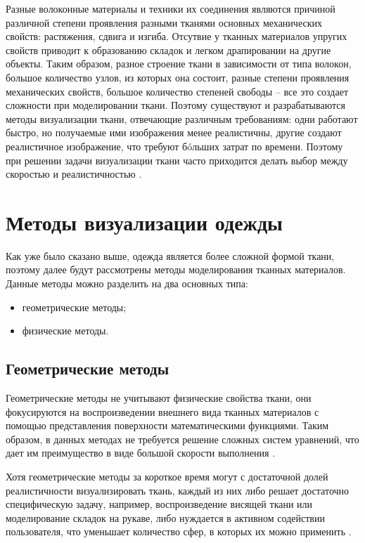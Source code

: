 Разные волоконные материалы и техники их соединения являются причиной
различной степени проявления разными тканями основных механических свойств:
растяжения, сдвига и изгиба. Отсутвие у тканных материалов упругих
свойств приводит к образованию складок и легком драпировании на другие
объекты. Таким образом, разное строение ткани в зависимости от типа волокон,
большое количество узлов, из которых она состоит, разные
степени проявления механических свойств, большое количество степеней свободы -- все это
создает сложности при моделировании ткани. Поэтому существуют и разрабатываются
методы визуализации ткани, отвечающие различным требованиям: одни работают
быстро, но получаемые ими изображения менее реалистичны, другие создают
реалистичное изображение, что требуют бóльших затрат по времени. Поэтому
при решении задачи визуализации ткани часто приходится делать выбор
между скоростью и реалистичностью \cite{bib11}.

\section{Методы визуализации одежды}

Как уже было сказано выше, одежда является более сложной формой ткани,
поэтому далее будут рассмотрены методы моделирования тканных материалов.
Данные методы можно разделить на два основных типа:
\begin{itemize}[left=\parindent]
    \item геометрические методы;
    \item физические методы.
\end{itemize}

\subsection{Геометрические методы}

Геометрические методы не учитывают физические свойства ткани, они фокусируются
на воспроизведении внешнего вида тканных материалов с помощью представления
поверхности математическими функциями. Таким образом, в данных методах не
требуется решение сложных систем уравнений, что дает им преимущество в виде
большой скорости выполнения \cite{bib07}.

Хотя геометрические методы за короткое время могут с достаточной долей
реалистичности визуализировать ткань, каждый из них либо решает достаточно
специфическую задачу, например, воспроизведение висящей ткани или моделирование
складок на рукаве, либо нуждается в активном содействии пользователя, что
уменьшает количество сфер, в которых их можно применить \cite{bib07}.

